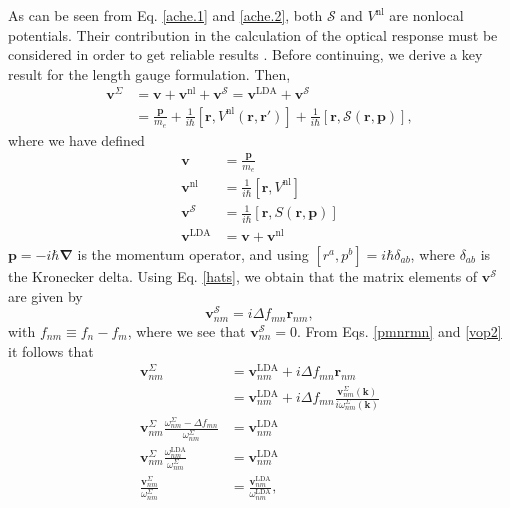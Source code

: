 As can be seen from Eq. \eqref{ache.1} and \eqref{ache.2}, both $\mathcal{S}$
and $V^{\mathrm{nl}}$ are nonlocal potentials. Their contribution in the
calculation of the optical response must be considered in order to get reliable
results \cite{ismailPRL01}. Before continuing, we derive a key result for the
length gauge formulation. Then,
\begin{equation}\label{vop2}
\begin{split}
\mathbf{v}^{\Sigma}
&=\mathbf{v} + \mathbf{v}^{\mathrm{nl}} 
+ \mathbf{v}^{\mathcal{S}}
= \mathbf{v}^\mathrm{LDA} + \mathbf{v}^{\mathcal{S}}\\
&=\frac{\mathbf{p}}{m_{e}} + \frac{1}{i\hbar}
  \left[\mathbf{r},V^{\mathrm{nl}}(\mathbf{r},\mathbf{r}')\right]
+ \frac{1}{i\hbar}
  \left[\mathbf{r},\mathcal{S}(\mathbf{r},\mathbf{p})\right],
\end{split}
\end{equation}
where we have defined
\begin{equation}\label{conhr}
\begin{split}
\mathbf{v} &=\frac{\mathbf{p}}{m_{e}}\\
\mathbf{v}^{\mathrm{nl}} &= \frac{1}{i\hbar}
  \left[\mathbf{r},V^{\mathrm{nl}}\right]\\
\mathbf{v}^{\mathcal{S}} &= \frac{1}{i\hbar}
  \left[\mathbf{r},S(\mathbf{r},\mathbf{p})\right]\\
\mathbf{v}^\mathrm{LDA} &= \mathbf{v}+\mathbf{v}^{\mathrm{nl}}
\end{split}
\end{equation}  
$\mathbf{p}= -i\hbar\boldsymbol{\nabla}$ is the momentum operator, and
using $[r^a,p^b]=i\hbar\delta_{ab}$, where $\delta_{ab}$ is the Kronecker
delta. Using Eq. \eqref{hats}, we obtain that the matrix elements of
$\mathbf{v}^{\mathcal{S}}$ are given by
\begin{equation}\label{chon.2} 
\mathbf{v}^{\mathcal{S}}_{nm} = i\Delta f_{mn}\mathbf{r}_{nm},
\end{equation}
with $f_{nm} \equiv f_{n} - f_{m}$, where we see that
$\mathbf{v}^{\mathcal{S}}_{nn} = 0$. From Eqs. \eqref{pmnrmn} and \eqref{vop2}
it follows that
\begin{align}\label{chon.8}
\mathbf{v}^\Sigma_{nm} 
&= \mathbf{v}^\mathrm{LDA}_{nm} + i\Delta f_{mn}\mathbf{r}_{nm}\nonumber\\
&= \mathbf{v}^\mathrm{LDA}_{nm} + i\Delta f_{mn}
   \frac{\mathbf{v}^\Sigma_{nm}(\mathbf{k})}{i\omega^\Sigma_{nm}(\mathbf{k})}
   \nonumber\\
\mathbf{v}^\Sigma_{nm}
  \frac{\omega^\Sigma_{nm}-\Delta f_{mn}}{\omega^\Sigma_{nm}}
&= \mathbf{v}^\mathrm{LDA}_{nm}\nonumber\\
\mathbf{v}^\Sigma_{nm}\frac{\omega^{\mathrm{LDA}}_{nm}}{\omega^\Sigma_{nm}}
&= \mathbf{v}^\mathrm{LDA}_{nm}\nonumber\\
\frac{\mathbf{v}^\Sigma_{nm}}{\omega^\Sigma_{nm}}
&= \frac{\mathbf{v}^\mathrm{LDA}_{nm}}{\omega^{\mathrm{LDA}}_{nm}},
\end{align}
